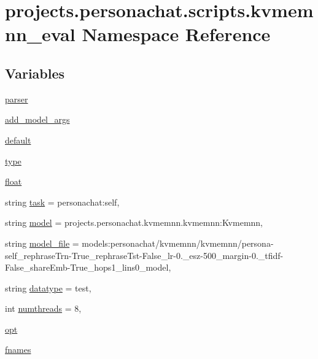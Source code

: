 \hypertarget{namespaceprojects_1_1personachat_1_1scripts_1_1kvmemnn__eval}{}\section{projects.\+personachat.\+scripts.\+kvmemnn\+\_\+eval Namespace Reference}
\label{namespaceprojects_1_1personachat_1_1scripts_1_1kvmemnn__eval}
\subsection*{Variables}
\begin{DoxyCompactItemize}
\item 
\hyperlink{namespaceprojects_1_1personachat_1_1scripts_1_1kvmemnn__eval_a63fe5b651c3e9e6afbb51c841fc6f1df}{parser}
\item 
\hyperlink{namespaceprojects_1_1personachat_1_1scripts_1_1kvmemnn__eval_a946f577f736f403b5886b3566649591f}{add\+\_\+model\+\_\+args}
\item 
\hyperlink{namespaceprojects_1_1personachat_1_1scripts_1_1kvmemnn__eval_a00f2399fa8227f1aa1a5ed312f25d5c8}{default}
\item 
\hyperlink{namespaceprojects_1_1personachat_1_1scripts_1_1kvmemnn__eval_a52b955236005ddbf4e85e792147db317}{type}
\item 
\hyperlink{namespaceprojects_1_1personachat_1_1scripts_1_1kvmemnn__eval_a6350a0ff855257ed96d21e4d106fbd73}{float}
\item 
string \hyperlink{namespaceprojects_1_1personachat_1_1scripts_1_1kvmemnn__eval_ad8a197b755ccd4f290fb97b13e2de9e0}{task} = \textquotesingle{}personachat\+:self\textquotesingle{},
\item 
string \hyperlink{namespaceprojects_1_1personachat_1_1scripts_1_1kvmemnn__eval_a3335b1ed366d22d2ca596e63c1c589c4}{model} = \textquotesingle{}projects.\+personachat.\+kvmemnn.\+kvmemnn\+:\+Kvmemnn\textquotesingle{},
\item 
string \hyperlink{namespaceprojects_1_1personachat_1_1scripts_1_1kvmemnn__eval_a80c9d4cb41e9ad0b78cb4ff046a0da54}{model\+\_\+file} = \textquotesingle{}models\+:personachat/kvmemnn/kvmemnn/persona-\/self\+\_\+rephrase\+Trn-\/True\+\_\+rephrase\+Tst-\/False\+\_\+lr-\/0.\+\_\+esz-\/500\+\_\+margin-\/0.\+\_\+tfidf-\/\+False\+\_\+share\+Emb-\/\+True\+\_\+hops1\+\_\+lins0\+\_\+model\textquotesingle{},
\item 
string \hyperlink{namespaceprojects_1_1personachat_1_1scripts_1_1kvmemnn__eval_a01863e3f8b4e8c810bf73a9b5e654218}{datatype} = \textquotesingle{}test\textquotesingle{},
\item 
int \hyperlink{namespaceprojects_1_1personachat_1_1scripts_1_1kvmemnn__eval_a9a3b030b7e324b6ea8d8dc51f64efcc7}{numthreads} = 8,
\item 
\hyperlink{namespaceprojects_1_1personachat_1_1scripts_1_1kvmemnn__eval_a326a8f5dac63a35017b573e99d1653bc}{opt}
\item 
\hyperlink{namespaceprojects_1_1personachat_1_1scripts_1_1kvmemnn__eval_aa8075948f352375967e89a9ba38375dc}{fnames}
\end{DoxyCompactItemize}


